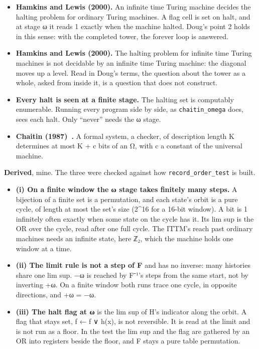 \begin{itemize}
\item \textbf{Hamkins and Lewis (2000).} An infinite time Turing machine decides the halting problem for ordinary Turing machines. A flag cell is set on halt, and at stage ω it reads 1 exactly when the machine halted. Doug's point 2 holds in this sense: with the completed tower, the forever loop is answered.
\item \textbf{Hamkins and Lewis (2000).} The halting problem for infinite time Turing machines is not decidable by an infinite time Turing machine: the diagonal moves up a level. Read in Doug's terms, the question about the tower as a whole, asked from inside it, is a question that does not construct.
\item \textbf{Every halt is seen at a finite stage.} The halting set is computably enumerable. Running every program side by side, as \texttt{chaitin\_\allowbreak{}omega} does, sees each halt. Only “never” needs the ω stage.
\item \textbf{Chaitin (1987)~\cite{src:Chaitin-1987}.} A formal system, a checker, of description length K determines at most K + c bits of an Ω, with c a constant of the universal machine.
\end{itemize}

\textbf{Derived}, mine. The three were checked against how \texttt{record\_\allowbreak{}order\_\allowbreak{}test} is built.

\begin{itemize}
\item \textbf{(i) On a finite window the ω stage takes finitely many steps.} A bijection of a finite set is a permutation, and each state's orbit is a pure cycle, of length at most the set's size (2\textasciicircum{}16 for a 16-bit window). A bit is 1 infinitely often exactly when some state on the cycle has it. Its lim sup is the OR over the cycle, read after one full cycle. The ITTM's reach past ordinary machines needs an infinite state, here ℤ₂, which the machine holds one window at a time.
\item \textbf{(ii) The limit rule is not a step of F} and has no inverse: many histories share one lim sup. −ω is reached by F⁻¹'s steps from the same start, not by inverting +ω. On a finite window both runs trace one cycle, in opposite directions, and +ω = −ω.
\item \textbf{(iii) The halt flag at ω} is the lim sup of H's indicator along the orbit. A flag that stays set, f ← f ∨ h(x), is not reversible. It is read at the limit and is not run as a floor. In the test the lim sup and the flag are gathered by an OR into registers beside the floor, and F stays a pure table permutation.
\end{itemize}

